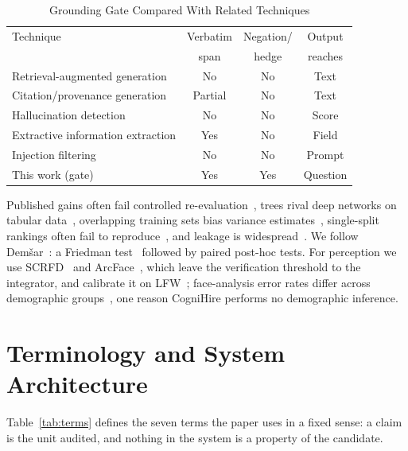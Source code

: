 \documentclass[conference,a4paper]{IEEEtran}
\begin{document}
\begin{table}[b]
\caption{Grounding Gate Compared With Related Techniques}
\label{tab:novelty}
\centering
\footnotesize
\begin{tabular}{@{}lccc@{}}
\toprule
Technique & Verbatim & Negation/ & Output \\
          & span     & hedge     & reaches \\
\midrule
Retrieval-augmented generation & No  & No  & Text \\
Citation/provenance generation & Partial & No & Text \\
Hallucination detection~\cite{ji2023} & No & No & Score \\
Extractive information extraction & Yes & No & Field \\
Injection filtering~\cite{greshake2023} & No & No & Prompt \\
This work (gate) & Yes & Yes & Question \\
\bottomrule
\end{tabular}
\end{table}

Published gains often fail controlled re-evaluation~\cite{dacrema2019,musgrave2020},
trees rival deep networks on tabular data~\cite{grinsztajn2022}, overlapping
training sets bias variance estimates~\cite{nadeau2003}, single-split rankings
often fail to reproduce~\cite{gorman2019}, and leakage is
widespread~\cite{kapoor2023}. We follow Dem\v{s}ar~\cite{demsar2006}: a
Friedman test~\cite{friedman1937} followed by paired post-hoc tests. For
perception we use SCRFD~\cite{guo2022} and ArcFace~\cite{deng2019}, which leave
the verification threshold to the integrator, and calibrate it on
LFW~\cite{huang2007}; face-analysis error rates differ across demographic
groups~\cite{buolamwini2018}, one reason CogniHire performs no demographic
inference.

\section{Terminology and System Architecture}
\label{sec:arch}
Table~\ref{tab:terms} defines the seven terms the paper uses in a fixed
sense: a claim is the unit audited, and nothing in the system is a property
of the candidate.
\end{document}
